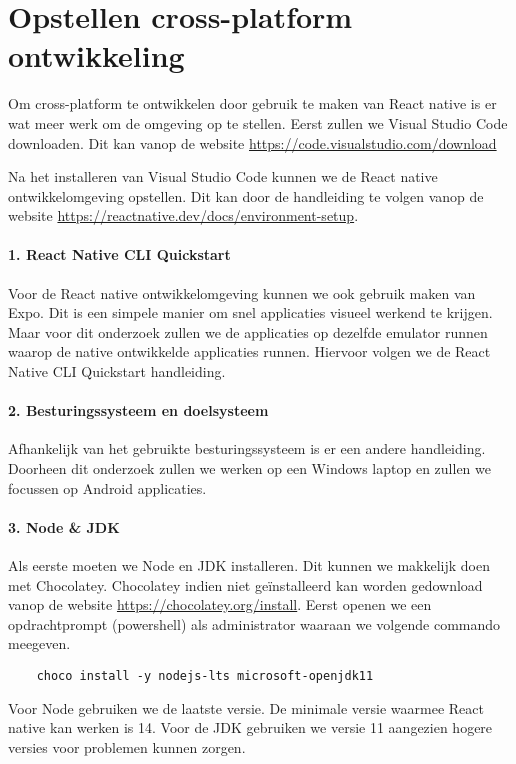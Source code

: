 \section{Opstellen cross-platform ontwikkeling}
Om cross-platform te ontwikkelen door gebruik te maken van React native is er wat meer werk om 
de omgeving op te stellen. Eerst zullen we Visual Studio Code downloaden. 
Dit kan vanop de website \url{https://code.visualstudio.com/download} 

Na het installeren van Visual Studio Code kunnen we de React native ontwikkelomgeving opstellen. 
Dit kan door de handleiding te volgen vanop de website \url{https://reactnative.dev/docs/environment-setup}.

\paragraph{1. React Native CLI Quickstart}
Voor de React native ontwikkelomgeving kunnen we ook gebruik maken van Expo. 
Dit is een simpele manier om snel applicaties visueel werkend te krijgen. 
Maar voor dit onderzoek zullen we de applicaties op dezelfde emulator runnen waarop de native 
ontwikkelde applicaties runnen. Hiervoor volgen we de React Native CLI Quickstart handleiding. 

\paragraph{2. Besturingssysteem en doelsysteem}
Afhankelijk van het gebruikte besturingssysteem is er een andere handleiding. 
Doorheen dit onderzoek zullen we werken op een Windows laptop en zullen we focussen op Android applicaties.

\paragraph{3. Node \& JDK}
Als eerste moeten we \gls{Node} en \gls{JDK} installeren. Dit kunnen we makkelijk 
doen met \gls{Chocolatey}. Chocolatey indien niet geïnstalleerd kan worden gedownload 
vanop de website \url{https://chocolatey.org/install}. Eerst openen we een 
opdrachtprompt (powershell) als administrator waaraan we volgende commando meegeven.
\begin{verbatim}
    choco install -y nodejs-lts microsoft-openjdk11
\end{verbatim}
Voor Node gebruiken we de laatste versie. De minimale versie waarmee React native kan werken is 14. 
Voor de JDK gebruiken we versie 11 aangezien hogere versies voor problemen kunnen zorgen.

